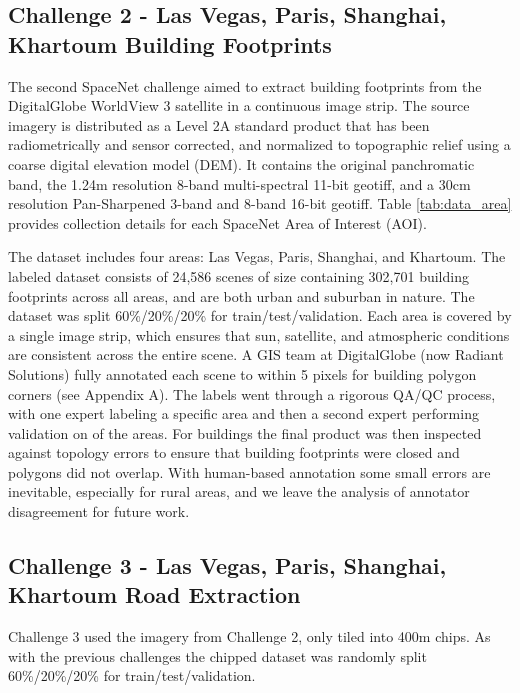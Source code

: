 \documentclass{article}
\begin{document}
\subsection{Challenge 2 - Las Vegas, Paris, Shanghai, Khartoum Building Footprints}

The second SpaceNet challenge aimed to extract building footprints from the DigitalGlobe WorldView 3  satellite in a continuous image strip. The source imagery is distributed as a Level 2A standard product that has been radiometrically and sensor corrected, and normalized to topographic relief using a coarse digital elevation model (DEM). It contains the original panchromatic band, the 1.24m resolution 8-band multi-spectral 11-bit geotiff, and a 30cm resolution Pan-Sharpened 3-band and 8-band 16-bit geotiff. Table \ref{tab:data_area} provides collection details for each SpaceNet Area of Interest (AOI). 

The dataset includes four areas: Las Vegas, Paris, Shanghai, and Khartoum. The labeled dataset consists of 24,586 scenes of size  
containing 302,701 building footprints across all areas, and are both urban and suburban in nature. 
The dataset was split 60\%/20\%/20\% for train/test/validation.
Each area is covered by a single image strip, which ensures that sun, satellite, and atmospheric conditions are consistent across the entire scene.
 A GIS team at DigitalGlobe (now Radiant Solutions) fully annotated each scene to within 5 pixels for building polygon corners (see Appendix A). The labels went through a rigorous QA/QC process, with one expert labeling a specific area and then a second expert performing validation on  of the areas. For buildings the final product was then inspected against topology errors to ensure that building footprints were closed and polygons did not overlap. With human-based annotation some small errors are inevitable, especially for rural areas, and we leave the analysis of annotator disagreement for future work.






\subsection{Challenge 3 - Las Vegas, Paris, Shanghai, Khartoum Road Extraction}

Challenge 3 used the imagery from Challenge 2,  only tiled into 400m chips. As with the previous challenges the chipped dataset was randomly split 60\%/20\%/20\% for train/test/validation.
\end{document}

